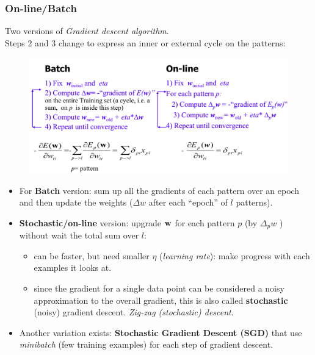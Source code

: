 \documentclass[../main.tex]{subfiles}
\begin{document}
\subsubsection{On-line/Batch}
Two versions of \emph{Gradient descent algorithm}.\\
Steps 2 and 3 change to express an inner or external cycle on the patterns:
\begin{figure}[H]
    \centering
    \includegraphics[scale = 0.35]{lectures/4_neural_networks/4_batch_online.png}
    \label{fig:4_batch_online}
\end{figure}
\begin{itemize}
    \item For \textbf{Batch} version: sum up all the gradients of each pattern over an epoch and then update the weights ($\Delta w$ after each “epoch” of $l$ patterns).
    \item \textbf{Stochastic/on-line} version: upgrade $\bold{w}$ for each pattern $p$ (by $\Delta_p w$ ) without wait the total sum over $l$:
    \begin{itemize}
        \item can be faster, but need smaller $\eta$ (\emph{learning rate}): make progress with each examples it looks at.
        \item since the gradient for a single data point can be considered a noisy approximation to the overall gradient, this is also called \textbf{stochastic} (noisy) gradient descent. \emph{Zig-zag (stochastic) descent}.
    \end{itemize}
    \item Another variation exists: \textbf{Stochastic Gradient Descent (SGD)} that use \emph{minibatch} (few training examples) for each step of gradient descent.
\end{itemize}
\end{document}
